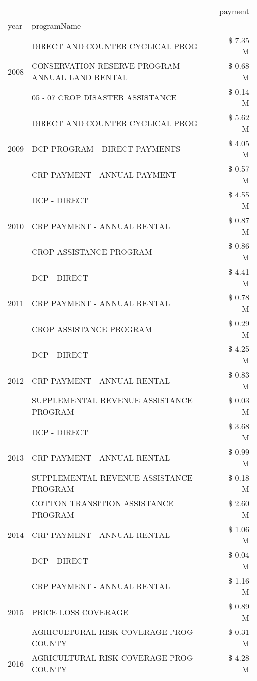 \begin{tabular}{llr}
\toprule
 &  & payment \\
year & programName &  \\
\midrule
\multirow[t]{3}{*}{2008} & DIRECT AND COUNTER CYCLICAL PROG & \$ 7.35 M \\
 & CONSERVATION RESERVE PROGRAM - ANNUAL LAND RENTAL & \$ 0.68 M \\
 & 05 - 07 CROP DISASTER ASSISTANCE & \$ 0.14 M \\
\cline{1-3}
\multirow[t]{3}{*}{2009} & DIRECT AND COUNTER CYCLICAL PROG & \$ 5.62 M \\
 & DCP PROGRAM - DIRECT PAYMENTS & \$ 4.05 M \\
 & CRP PAYMENT - ANNUAL PAYMENT & \$ 0.57 M \\
\cline{1-3}
\multirow[t]{3}{*}{2010} & DCP - DIRECT & \$ 4.55 M \\
 & CRP PAYMENT - ANNUAL RENTAL & \$ 0.87 M \\
 & CROP ASSISTANCE PROGRAM & \$ 0.86 M \\
\cline{1-3}
\multirow[t]{3}{*}{2011} & DCP - DIRECT & \$ 4.41 M \\
 & CRP PAYMENT - ANNUAL RENTAL & \$ 0.78 M \\
 & CROP ASSISTANCE PROGRAM & \$ 0.29 M \\
\cline{1-3}
\multirow[t]{3}{*}{2012} & DCP - DIRECT & \$ 4.25 M \\
 & CRP PAYMENT - ANNUAL RENTAL & \$ 0.83 M \\
 & SUPPLEMENTAL REVENUE ASSISTANCE PROGRAM & \$ 0.03 M \\
\cline{1-3}
\multirow[t]{3}{*}{2013} & DCP - DIRECT & \$ 3.68 M \\
 & CRP PAYMENT - ANNUAL RENTAL & \$ 0.99 M \\
 & SUPPLEMENTAL REVENUE ASSISTANCE PROGRAM & \$ 0.18 M \\
\cline{1-3}
\multirow[t]{3}{*}{2014} & COTTON TRANSITION ASSISTANCE PROGRAM & \$ 2.60 M \\
 & CRP PAYMENT - ANNUAL RENTAL & \$ 1.06 M \\
 & DCP - DIRECT & \$ 0.04 M \\
\cline{1-3}
\multirow[t]{3}{*}{2015} & CRP PAYMENT - ANNUAL RENTAL & \$ 1.16 M \\
 & PRICE LOSS COVERAGE & \$ 0.89 M \\
 & AGRICULTURAL RISK COVERAGE PROG - COUNTY & \$ 0.31 M \\
\cline{1-3}
\multirow[t]{3}{*}{2016} & AGRICULTURAL RISK COVERAGE PROG - COUNTY & \$ 4.28 M \\

\end{tabular}
